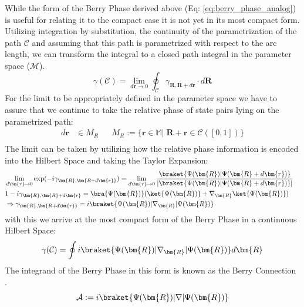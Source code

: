 \documentclass{article}
\begin{document}
While the form of the Berry Phase derived above (Eq: \ref{eq:berry_phase_analog}) is useful for relating it to the compact case it is not yet in its most compact form. Utilizing integration by substitution, the continuity of the parametrization of the path $\mathcal{C}$ and assuming that this path is parametrized with respect to the arc length, we can transform the integral to a closed path integral in the parameter space ($\mathcal{M}$).
\begin{equation*}
  \gamma(\mathcal{C}) = \lim_{d\bm{r} \to 0} \oint_{\mathcal{C}} \gamma_{\bm{R}, \bm{R}+d\bm{r}} \cdot d\bm{R}
\end{equation*}
For the limit to be appropriately defined in the parameter space we have to assure that we continue to take the relative phase of state pairs lying on the parametrized path:
\begin{align*}
d\bm{r} &\in M_{R} && M_{R} := \{\bm{r} \in \mathbb{M}|\; \bm{R} + \bm{r} \in \mathcal{C}([0, 1])\}\\
\end{align*}
The limit can be taken by utilizing how the relative phase information is encoded into the Hilbert Space and taking the Taylor Expansion:
  \begin{equation*}
    \begin{aligned}
      &\lim_{d\bm{r} \to 0} \exp(-i \gamma_{\bm{R}, \bm{R + d\bm{r}}}) = 
       \lim_{d\bm{r} \to 0}\frac{\braket{\Psi(\bm{R})|\Psi(\bm{R} + d\bm{r})}}
       {|\braket{\Psi(\bm{R})|\Psi(\bm{R} +d\bm{r})}|}&\\
      &1 - i \gamma_{\bm{R}, \bm{R} + d\bm{r}} = \bra{\Psi(\bm{R})}(\ket{\Psi(\bm{R})} + \nabla_{\bm{R}} \ket{\Psi(\bm{R})})&\\
      &\Rightarrow \gamma_{\bm{R}, \bm{R + d\bm{r}}} =
       i\braket{\Psi(\bm{R})|\nabla_{\bm{R}}|\Psi(\bm{R})}
    \end{aligned}
  \end{equation*}
  with this we arrive at the most compact form of the Berry Phase in a continuous Hilbert Space:
  \begin{equation}
    \gamma(\mathcal{C}) = \oint i \braket{\Psi(\bm{R})|\nabla_{\bm{R}}|\Psi(\bm{R})} d\bm{R}
  \end{equation}
  The integrand of the Berry Phase in this form is known as the Berry Connection \cite{Asboth2016}. 
  \begin{equation*}
    \mathcal{A} := i \braket{\Psi(\bm{R})|\nabla|\Psi(\bm{R})}
  \end{equation*}
\end{document}
